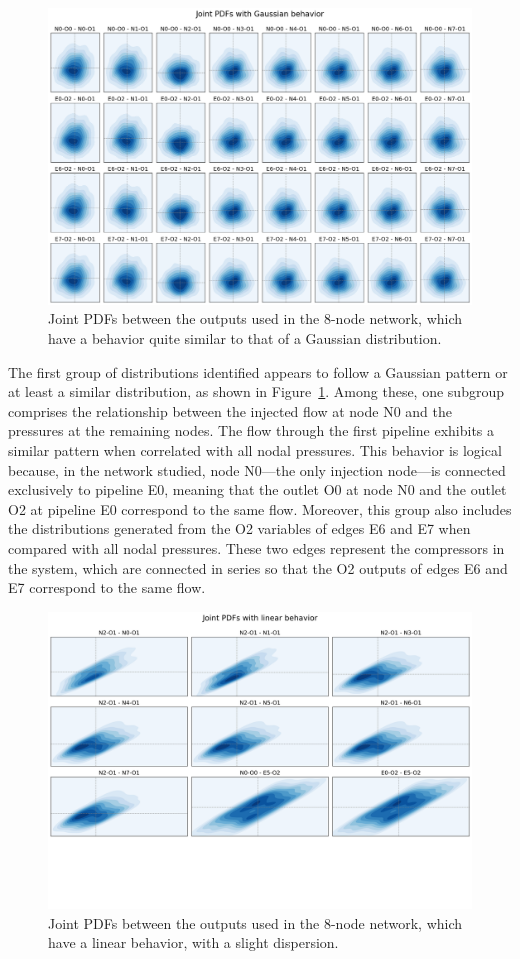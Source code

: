 \begin{figure}
    \begin{center}
        \includegraphics[width=.67\textwidth]{figures/Chapter_NonLinealCensnet/outputs_outputs_1.png}
    \end{center}
    \caption{Joint PDFs between the outputs used in the 8-node network, which have a behavior quite similar to that of a Gaussian distribution.}\label{fig:joint_distributions_output_output_1}
\end{figure}
 
The first group of distributions identified appears to follow a Gaussian pattern or at least a similar distribution, as shown in Figure~\cref{fig:joint_distributions_output_output_1}. Among these, one subgroup comprises the relationship between the injected flow at node N0 and the pressures at the remaining nodes. The flow through the first pipeline exhibits a similar pattern when correlated with all nodal pressures. This behavior is logical because, in the network studied, node N0—the only injection node—is connected exclusively to pipeline E0, meaning that the outlet O0 at node N0 and the outlet O2 at pipeline E0 correspond to the same flow. Moreover, this group also includes the distributions generated from the O2 variables of edges E6 and E7 when compared with all nodal pressures. These two edges represent the compressors in the system, which are connected in series so that the O2 outputs of edges E6 and E7 correspond to the same flow.


\begin{figure}
    \begin{center}
        \includegraphics[width=.67\textwidth]{figures/Chapter_NonLinealCensnet/outputs_outputs_2.png}
    \end{center}
    \caption{Joint PDFs between the outputs used in the 8-node network, which have a linear behavior, with a slight dispersion.}\label{fig:joint_distributions_output_output_2}
\end{figure}
 
